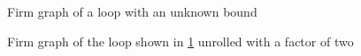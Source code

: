 \begin{figure}[H]
    \centering
    \begin{adjustbox}{max width=\textwidth}
        \centering
        
    \end{adjustbox}
    \caption{Firm graph of a loop with an unknown bound}
    \label{fig:impl:unroll:unroll-factor-2-before}
\end{figure}
\begin{figure}[h]
    \centering
    \begin{adjustbox}{max width=\textwidth}
        \centering
        
    \end{adjustbox}
    \caption{Firm graph of the loop shown in \cref{fig:impl:unroll:unroll-factor-2-before} unrolled with a factor of two}
    \label{fig:impl:unroll:unroll-factor-2-after}
\end{figure}